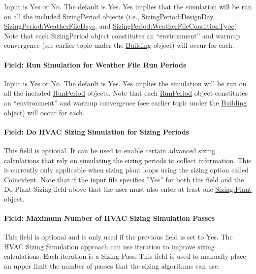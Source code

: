 Input is Yes or No. The default is Yes. Yes implies that the simulation will be run on all the included SizingPeriod objects (i.e., \hyperref[sizingperioddesignday]{Sizing\-Period:\-Design\-Day}, \hyperref[sizingperiodweatherfiledays]{Sizing\-Period:\-Weather\-File\-Days}, and \hyperref[sizingperiodweatherfileconditiontype]{Sizing\-Period:\-Weather\-File\-Condition\-Type}). Note that each Sizing\-Period object constitutes an ``environment'' and warmup convergence (see earlier topic under the \hyperref[building]{Building} object) will occur for each.

\paragraph{Field: Run Simulation for Weather File Run Periods}\label{field-run-simulation-for-weather-file-run-periods}

Input is Yes or No. The default is Yes. Yes implies the simulation will be run on all the included \hyperref[runperiod]{RunPeriod} objects. Note that each \hyperref[runperiod]{RunPeriod} object constitutes an ``environment'' and warmup convergence (see earlier topic under the \hyperref[building]{Building} object) will occur for each.

\paragraph{Field: Do HVAC Sizing Simulation for Sizing Periods}\label{field-do-hvac-sizing-simulation-for-sizing-periods}

This field is optional. It can be used to enable certain advanced sizing calculations that rely on simulating the sizing periods to collect information. This is currently only applicable when sizing plant loops using the sizing option called Coincident. Note that if the input file specifies ''Yes'' for both this field and the Do Plant Sizing field above that the user must also enter at least one \hyperref[sizingplant]{Sizing:Plant} object.

\paragraph{Field: Maximum Number of HVAC Sizing Simulation Passes}\label{field-maximum-number-of-hvac-sizing-simulation-passes}

This field is optional and is only used if the previous field is set to Yes. The HVAC Sizing Simulation approach can use iteration to improve sizing calculations. Each iteration is a Sizing Pass. This field is used to manually place an upper limit the number of passes that the sizing algorithms can use.

